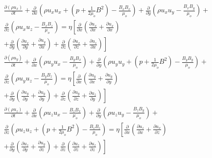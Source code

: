 \begin{eqnarray}
     \frac{\partial(\rho u_{x})}{\partial t}+\frac{\partial}{\partial x}\left(\rho u_{x}u_{x}+\left(p+\frac{1}{2\mu_{o}}B^{2}\right)-\frac{B_{x}B_{x}}{\mu_{o}}\right) + \frac{\partial}{\partial y}\left(\rho u_{x}u_{y}-\frac{B_{x}B_{y}}{\mu_{o}}\right)+\nonumber\\
     \frac{\partial}{\partial z}\left(\rho u_{x}u_{z}-\frac{B_{x}B_{z}}{\mu_{o}}\right)= \eta\left[\frac{\partial}{\partial x}\left(\frac{\partial u_{x}}{\partial x}+\frac{\partial u_{x}}{\partial x}\right) \right.\nonumber\\
     \left.+\frac{\partial}{\partial y}\left(\frac{\partial u_{x}}{\partial y}+\frac{\partial u_{y}}{\partial x}\right)+\frac{\partial}{\partial z}\left(\frac{\partial u_{x}}{\partial z}+\frac{\partial u_{z}}{\partial x}\right)\right]\\
     \frac{\partial(\rho u_{y})}{\partial t}+\frac{\partial}{\partial x}\left(\rho u_{y}u_{x}-\frac{B_{y}B_{x}}{\mu_{o}}\right) + \frac{\partial}{\partial y}\left(\rho u_{y}u_{y}+\left(p+\frac{1}{2\mu_{o}}B^{2}\right)-\frac{B_{y}B_{y}}{\mu_{o}}\right)+\nonumber\\
     \frac{\partial}{\partial z}\left(\rho u_{y}u_{z}-\frac{B_{y}B_{z}}{\mu_{o}}\right)= \eta\left[\frac{\partial}{\partial x}\left(\frac{\partial u_{y}}{\partial x}+\frac{\partial u_{y}}{\partial y}\right) \right.\nonumber\\
     \left.+\frac{\partial}{\partial y}\left(\frac{\partial u_{y}}{\partial y}+\frac{\partial u_{y}}{\partial y}\right)+\frac{\partial}{\partial z}\left(\frac{\partial u_{y}}{\partial z}+\frac{\partial u_{z}}{\partial y}\right)\right]\\
     \frac{\partial(\rho u_{z})}{\partial t}+\frac{\partial}{\partial x}\left(\rho u_{z}u_{x}-\frac{B_{z}B_{x}}{\mu_{o}}\right) + \frac{\partial}{\partial y}\left(\rho u_{z}u_{y}-\frac{B_{z}B_{y}}{\mu_{o}}\right)+\nonumber\\
     \frac{\partial}{\partial z}\left(\rho u_{z}u_{z}+\left(p+\frac{1}{2\mu_{o}}B^{2}\right)-\frac{B_{z}B_{z}}{\mu_{o}}\right)= \eta\left[\frac{\partial}{\partial x}\left(\frac{\partial u_{z}}{\partial x}+\frac{\partial u_{x}}{\partial z}\right) \right.\nonumber\\
     \left.+\frac{\partial}{\partial y}\left(\frac{\partial u_{z}}{\partial y}+\frac{\partial u_{y}}{\partial z}\right)+\frac{\partial}{\partial z}\left(\frac{\partial u_{z}}{\partial z}+\frac{\partial u_{z}}{\partial z}\right)\right]
\end{eqnarray}


